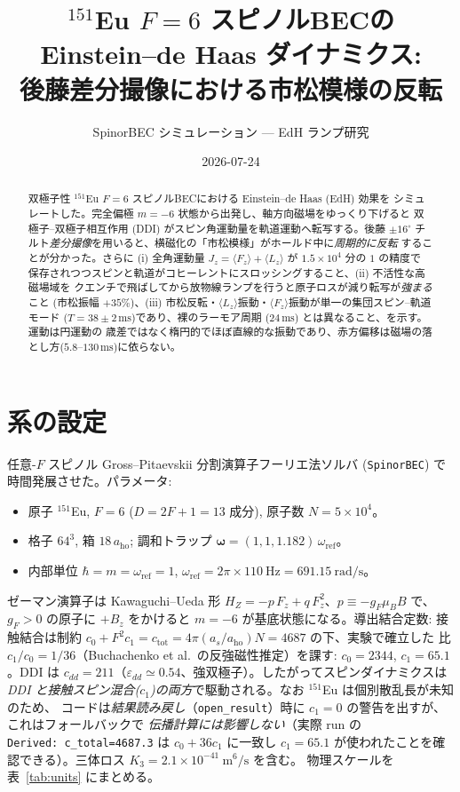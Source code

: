 \documentclass[11pt]{ltjsarticle}
\title{$^{151}$Eu $F{=}6$ スピノルBECの Einstein--de Haas ダイナミクス:\\
後藤差分撮像における市松模様の反転}
\author{SpinorBEC シミュレーション --- EdH ランプ研究}
\date{2026-07-24}
\newcommand{\Fz}{\langle F_z\rangle}
\newcommand{\Lz}{\langle L_z\rangle}
\newcommand{\Jz}{J_z}
\newcommand{\ms}{\,\mathrm{ms}}
\begin{document}
\maketitle

\begin{abstract}
双極子性 $^{151}$Eu $F{=}6$ スピノルBECにおける Einstein--de Haas (EdH) 効果を
シミュレートした。完全偏極 $m{=}{-}6$ 状態から出発し、軸方向磁場をゆっくり下げると
双極子--双極子相互作用 (DDI) がスピン角運動量を軌道運動へ転写する。後藤 $\pm16^\circ$
チルト\emph{差分撮像}を用いると、横磁化の「市松模様」がホールド中に\emph{周期的に反転}
することが分かった。さらに (i) 全角運動量 $\Jz=\Fz+\Lz$ が $1.5\times10^4$ 分の $1$ の精度で
保存されつつスピンと軌道がコヒーレントにスロッシングすること、(ii) 不活性な高磁場域を
クエンチで飛ばしてから放物線ランプを行うと原子ロスが減り転写が\emph{強まる}こと
(市松振幅 $+35\%$)、(iii) 市松反転・$\Lz$振動・$\Fz$振動が単一の集団スピン--軌道モード
($T=38\pm2\ms$)であり、裸のラーモア周期 ($24\ms$) とは異なること、を示す。運動は円運動の
歳差ではなく楕円的でほぼ直線的な振動であり、赤方偏移は磁場の落とし方($5.8$--$130\ms$)に依らない。
\end{abstract}

\section{系の設定}
任意-$F$ スピノル Gross--Pitaevskii 分割演算子フーリエ法ソルバ (\texttt{SpinorBEC}) で
時間発展させた。パラメータ:
\begin{itemize}\itemsep2pt
  \item 原子 $^{151}$Eu, $F{=}6$ ($D{=}2F{+}1=13$ 成分), 原子数 $N=5\times10^{4}$。
  \item 格子 $64^3$, 箱 $18\,a_{\mathrm{ho}}$; 調和トラップ
        $\boldsymbol\omega=(1,1,1.182)\,\omega_{\mathrm{ref}}$。
  \item 内部単位 $\hbar=m=\omega_{\mathrm{ref}}=1$,
        $\omega_{\mathrm{ref}}=2\pi\times110\ \mathrm{Hz}=691.15\ \mathrm{rad/s}$。
\end{itemize}
ゼーマン演算子は Kawaguchi--Ueda 形 $H_Z=-p\,F_z+q\,F_z^{2}$、$p\equiv-g_F\mu_B B$ で、
$g_F>0$ の原子に $+B_z$ をかけると $m{=}{-}6$ が基底状態になる。導出結合定数:
接触結合は制約 $c_0+F^2 c_1=c_{\mathrm{tot}}=4\pi(a_s/a_{\mathrm{ho}})N=4687$ の下、実験で確立した
比 $c_1/c_0=1/36$（Buchachenko et al.\ の反強磁性推定）を課す: $c_0=2344$, $c_1=65.1$。DDI は
$c_{dd}=211$（$\varepsilon_{dd}\simeq0.54$、強双極子）。したがってスピンダイナミクスは
\emph{DDI と接触スピン混合($c_1$)の両方}で駆動される。なお $^{151}$Eu は個別散乱長が未知のため、
コードは\emph{結果読み戻し}（\texttt{open\_result}）時に $c_1{=}0$ の警告を出すが、これはフォールバックで
\emph{伝播計算には影響しない}（実際 run の \texttt{Derived:\ c\_total=4687.3} は $c_0+36c_1$ に一致し
$c_1{=}65.1$ が使われたことを確認できる）。三体ロス $K_3=2.1\times10^{-41}\ \mathrm{m^6/s}$ を含む。
物理スケールを表~\ref{tab:units} にまとめる。
\end{document}
